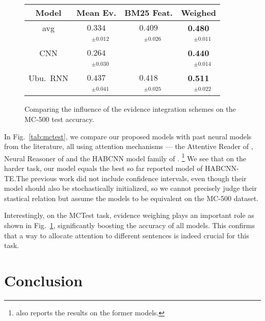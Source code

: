 \documentclass[11pt]{article}
\begin{document}
\begin{figure}[t]
\centering
\setlength{\tabcolsep}{3pt}
\begin{tabular}{|c|c|c|c|}
\hline
Model              & Mean Ev. & BM25 Feat. & Weighed \\
\hline
avg & $0.334$ & $0.409$ & \textbf{0.480}\\
 & $\quad^{\pm0.012}$ & $\quad^{\pm0.026}$ & $\quad^{\pm0.011}$\\
\hline
CNN & $0.264$ &  & \textbf{0.440}\\
 & $\quad^{\pm0.030}$ &  & $\quad^{\pm0.014}$\\
Ubu.\ RNN & $0.437$ & $0.418$ & \textbf{0.511}\\
 & $\quad^{\pm0.041}$ & $\quad^{\pm0.025}$ & $\quad^{\pm0.022}$\\
\hline
\end{tabular}
\setlength{\tabcolsep}{6pt}
\vspace*{-0.2cm}
\caption{\footnotesize%
	Comparing the influence of the evidence integration schemes on the MC-500 test accuracy.
}
\label{tab:mctestev}
\end{figure}

In Fig.~\ref{tab:mctest}, we compare our proposed models with past neural models
from the literature, all using attention mechanisms --- the Attentive Reader of \cite{ReadComprehend},
Neural Reasoner of \cite{NeuralReasoner} and the HABCNN model family of \cite{HABCNN}.%
\footnote{\cite{HABCNN} also reports the results on the former models.}
We see that on the harder task, our model equals the best
so far reported model of HABCNN-TE.\@  The previous work did not include
confidence intervals, even though their model should also be stochastically initialized,
so we cannot precisely judge their stastical relation but assume the models
to be equivalent on the MC-500 dataset.

Interestingly, on the MCTest task, evidence weighing plays an important role
as shown in Fig.~\ref{tab:mctestev},
significantly boosting the accuracy of all models.
This confirms that a way to allocate attention to different sentences
is indeed crucial for this task.




\section{Conclusion}
\label{sec:concl}
\end{document}
